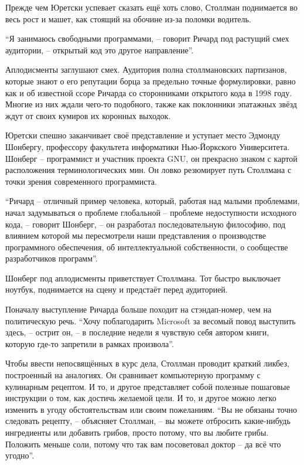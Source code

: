 Прежде чем Юретски успевает сказать ещё хоть слово, Столлман поднимается во весь рост и машет, как стоящий на обочине из-за поломки водитель.

\enquote{Я занимаюсь свободными программами, -- говорит Ричард под растущий смех аудитории, -- открытый код это другое направление}.

Аплодисменты заглушают смех. Аудитория полна столлмановских партизанов, которые знают о его репутации борца за предельно точные формулировки, равно как и об известной ссоре Ричарда со сторонниками открытого кода в 1998 году. Многие из них ждали чего-то подобного, также как поклонники эпатажных звёзд ждут от своих кумиров их коронных выходок.

Юретски спешно заканчивает своё представление и уступает место Эдмонду Шонбергу, профессору факультета информатики Нью-Йоркского Университета. Шонберг -- программист и участник проекта GNU, он прекрасно знаком с картой расположения терминологических мин. Он ловко резюмирует путь Столлмана с точки зрения современного программиста.

\enquote{Ричард -- отличный пример человека, который, работая над малыми проблемами, начал задумываться о проблеме глобальной -- проблеме недоступности исходного кода, -- говорит Шонберг, -- он разработал последовательную философию, под влиянием которой мы пересмотрели наши представления о производстве программного обеспечения, об интеллектуальной собственности, о сообществе разработчиков программ}.

Шонберг под аплодисменты приветствует Столлмана. Тот быстро выключает ноутбук, поднимается на сцену и предстаёт перед аудиторией.

Поначалу выступление Ричарда больше походит на стэндап-номер, чем на политическую речь. \enquote{Хочу поблагодарить Microsoft за весомый повод выступить здесь, -- острит он, -- в последние недели я чувствую себя автором книги, которую где-то запретили в рамках произвола}.

Чтобы ввести непосвящённых в курс дела, Столлман проводит краткий ликбез, построенный на аналогиях. Он сравнивает компьютерную программу с кулинарным рецептом. И то, и другое представляет собой полезные пошаговые инструкции о том, как достичь желаемой цели. И то, и другое можно легко изменить в угоду обстоятельствам или своим пожеланиям. \enquote{Вы не обязаны точно следовать рецепту, -- объясняет Столлман, -- вы можете отбросить какие-нибудь ингредиенты или добавить грибов, просто потому, что вы любите грибы. Положить меньше соли, потому что так вам посоветовал доктор -- да всё что угодно}.

